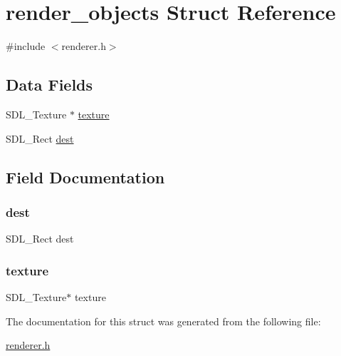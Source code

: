 \hypertarget{structrender__objects}{}\section{render\+\_\+objects Struct Reference}
\label{structrender__objects}


{\ttfamily \#include $<$renderer.\+h$>$}

\subsection*{Data Fields}
\begin{DoxyCompactItemize}
\item 
S\+D\+L\+\_\+\+Texture $\ast$ \mbox{\hyperlink{structrender__objects_a859b8efbf9abe8e82757ee5c75a0c97c}{texture}}
\item 
S\+D\+L\+\_\+\+Rect \mbox{\hyperlink{structrender__objects_a1d4c1bb15892e31b9af1f4fcf5d31fab}{dest}}
\end{DoxyCompactItemize}


\subsection{Field Documentation}
\mbox{\label{structrender__objects_a1d4c1bb15892e31b9af1f4fcf5d31fab}} 
\subsubsection{\texorpdfstring{dest}{dest}}
{\footnotesize\ttfamily S\+D\+L\+\_\+\+Rect dest}

\mbox{\label{structrender__objects_a859b8efbf9abe8e82757ee5c75a0c97c}} 
\subsubsection{\texorpdfstring{texture}{texture}}
{\footnotesize\ttfamily S\+D\+L\+\_\+\+Texture$\ast$ texture}



The documentation for this struct was generated from the following file\+:\begin{DoxyCompactItemize}
\item 
\mbox{\hyperlink{renderer_8h}{renderer.\+h}}\end{DoxyCompactItemize}
